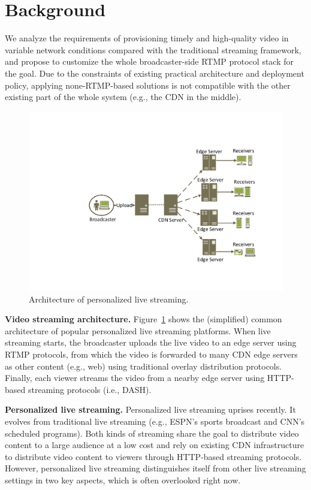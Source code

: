 \section{Background}
We analyze the requirements of provisioning timely and high-quality video in variable network conditions compared with the traditional streaming framework, and propose to customize the whole broadcaster-side RTMP protocol stack for the goal. Due to the constraints of existing practical architecture and deployment policy, applying none-RTMP-based solutions is not compatible with the other existing part of the whole system (e.g., the CDN in the middle).

\begin{figure}[t]
\centerline{\includegraphics[width=0.8\columnwidth]{fig/architecture.pdf}}
\vspace{-0.08in}
\caption{Architecture of personalized live streaming.}
\vspace{-0.25in}
\label{fig:architecture}
\end{figure}
\textbf{Video streaming architecture.}
Figure~\ref{fig:architecture} shows the (simplified) common architecture
of popular personalized live streaming platforms. When live streaming
starts, the broadcaster uploads the live video to an edge server using
RTMP protocols, from which the video is forwarded to many CDN edge servers
as other content (e.g., web) using traditional overlay distribution
protocols. Finally, each viewer streams the video from a nearby edge
server using HTTP-based streaming protocols (i.e., DASH).

\textbf{Personalized live streaming.}
Personalized live streaming uprises recently. It evolves from traditional live streaming (e.g., ESPN's sports broadcast
and CNN's scheduled programs). Both kinds of streaming share the goal to distribute video content to a large audience at a low cost and  rely on existing CDN infrastructure to distribute video content to viewers through HTTP-based streaming protocols. However, personalized live streaming distinguishes itself from
other live streaming settings in two key aspects, which is often overlooked right now.

